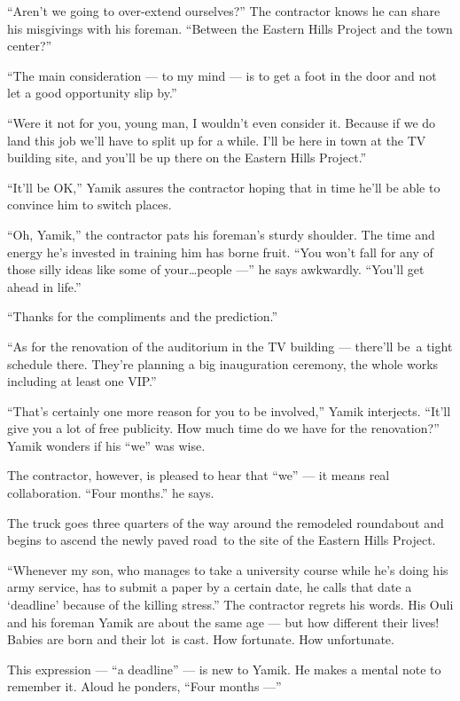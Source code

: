 \documentclass[twoside,11pt,openany]{book}
\begin{document}
``Aren't we going to over-extend ourselves?'' The contractor knows he can share his misgivings
with his foreman. ``Between the Eastern Hills Project and the town center?''

``The main consideration --- to my mind --- is to get a foot in the door and not let a good opportunity slip
by.''

``Were it not for you, young man, I wouldn't even consider it. Because if we do land this job we'll have to
split up for a while. I'll be here in town at the TV building site, and you'll be up there on the Eastern Hills
Project.''

``It'll be OK,'' Yamik assures the contractor hoping that in time he'll be able to convince
him to switch places.

``Oh, Yamik,'' the contractor pats his foreman's sturdy shoulder. The time and energy he's
invested in training him has borne fruit. ``You won't fall for any of those silly ideas like some of
your{\ldots}people ---'' he says awkwardly. ``You'll get ahead in life.''

``Thanks for the compliments and the prediction.''

``As for the renovation of the auditorium in the TV building --- there'll be~a tight schedule there. They're
planning a big inauguration ceremony, the whole works including at least one VIP.''

``That's certainly one more reason for you to be involved,'' Yamik interjects.
``It'll give you a lot of free publicity. How much time do we have for the renovation?''
Yamik wonders if his ``we'' was wise.

The contractor, however, is pleased to hear that ``we'' --- it means real collaboration. ``Four
months.'' he says.

The truck goes three quarters of the way around the remodeled roundabout and begins to ascend the newly paved road~to
the site of the Eastern Hills Project.

``Whenever my son, who manages{ }to take a university course while he's doing his army
service, has to submit a paper by a certain date, he calls that date a `deadline' because of the killing
stress.'' The contractor regrets his words. His Ouli and his foreman Yamik are about the same age --- but
how different their lives! Babies are born and their lot~is cast. How fortunate. How unfortunate.

This expression --- ``a deadline'' --- is new to Yamik. He makes a mental note to remember it.
Aloud he ponders, ``Four months ---''
\end{document}
